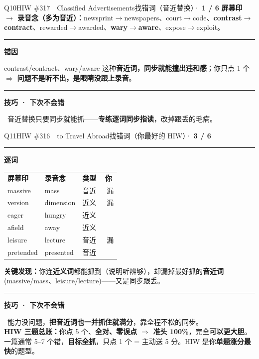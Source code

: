 \documentclass[11pt]{article}
\newcommand{\yes}{{\color{cFix}\ding{51}}}
\newcommand{\no}{{\color{cWrong}\ding{55}}}
\newcommand{\ptesub}[1]{%
  \par\needspace{2\baselineskip}\smallskip
  {\color{cAccent}\rule[-0.2ex]{3pt}{1.05em}}\hspace{6pt}%
  {\bfseries\color{cHead}#1}\par\nopagebreak\smallskip}
\begin{document}
\begin{qblock}{Q10\quad HIW \#317\ \ Classified Advertisements}{找错词（音近替换）· \textcolor{cWrong}{\bfseries 1 / 6}}
\textbf{屏幕印 $\to$ 录音念（多为音近）：}newsprint$\to$newspapers、court$\to$code、\textbf{contrast$\to$contract}、rewarded$\to$awarded、\textbf{wary$\to$aware}、expose$\to$exploit。
\ptesub{错因}
contrast/contract、wary/aware 这种\textbf{音近词，同步就能撞出违和感}；你只点 1 个 $\Rightarrow$ \textbf{问题不是听不出，是眼睛没跟上录音}。
\ptesub{技巧 · 下次不会错}
\begin{notebox}\small
\yes\ 音近替换只要同步就能抓——\textbf{专练逐词同步指读}，改掉跟丢的毛病。
\end{notebox}
\end{qblock}

\begin{qblock}{Q11\quad HIW \#316\ \ to Travel Abroad}{找错词（你最好的 HIW）· \textcolor{cPartial}{\bfseries 3 / 6}}
\ptesub{逐词}
\begin{center}\small
\begin{tabular}{@{}lllc@{}}
\textbf{屏幕印} & \textbf{录音念} & \textbf{类型} & \textbf{你} \\
massive & mass & 音近 & \no\ 漏 \\
version & dimension & 近义 & \no\ 漏 \\
eager & hungry & 近义 & \yes \\
afield & away & 近义 & \yes \\
leisure & lecture & 音近 & \no\ 漏 \\
pretended & presented & 音近 & \yes \\
\end{tabular}
\end{center}
\textbf{关键发现：}你连\textbf{近义词}都能抓到（说明听辨够），却漏掉最好抓的\textbf{音近词}(massive/mass、leisure/lecture)——又是同步跟丢。
\ptesub{技巧 · 下次不会错}
\begin{notebox}\small
\yes\ 能力没问题，\textbf{把音近词也一并抓住就满分}，靠全程不松的同步。\\[2pt]
\textbf{HIW 三题总账：}你点 5 个、\textbf{全对、零误点 $\Rightarrow$ 准头 100\%}，完全\textbf{可以更大胆}。
一篇通常 5–7 个错，\textbf{目标全抓}，只点 1 个 = 主动送 5 分。HIW 是你\textbf{单题涨分最快}的题型。
\end{notebox}
\end{qblock}
\end{document}
